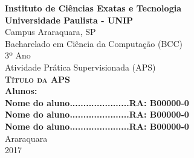 \begin{titlepage}
  \centering
  \Large
  \textbf{Instituto de Ciências Exatas e Tecnologia \\ 
  			Universidade Paulista - UNIP}\\
  			
  Campus Araraquara, SP\\[2em]%
  
  Bacharelado em Ciência da Computação (BCC)\\%
  3º Ano\\[7em]%
  Atividade Prática Supervisionada (APS)\\
  \textsc{\textbf{\fontsize{17}{\baselineskip}\selectfont Título da APS}}\\[7em]

  
  \textbf{Alunos:}\\
  \textbf{\normalsize Nome do aluno......................RA: B00000-0}\\
  \textbf{\normalsize Nome do aluno......................RA: B00000-0}\\	
  \textbf{\normalsize Nome do aluno......................RA: B00000-0} \\[10em]
  
  Araraquara\\ 2017 %
\end{titlepage}